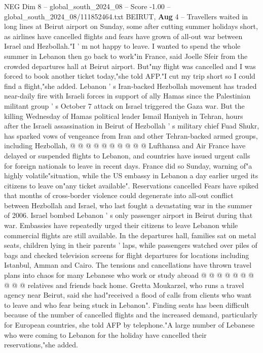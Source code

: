 \begin{textsample}{NEG Dim 8 – global\_south\_2024\_08 – Score -1.00 – global\_south\_2024\_08/111852464.txt}  \label{ex:f8_neg_075}
BEIRUT, \textbf{Aug} 4 -- Travellers waited in long lines at Beirut airport on Sunday, some after cutting summer holidays short, as airlines have cancelled flights and fears have grown of all-out war between Israel and Hezbollah."I ' m not happy to leave.
I wanted to spend the whole summer in Lebanon then go back to work"in France, said Joelle Sfeir from the crowded departures hall at Beirut airport.
But"my flight was cancelled and I was forced to book another ticket today,"she told AFP."I cut my trip short so I could find a flight,"she added.
Lebanon ' s Iran-backed Hezbollah movement has traded near-daily fire with Israeli forces in support of ally Hamas since the Palestinian militant group ' s October 7 attack on Israel triggered the Gaza war.
But the killing Wednesday of Hamas political leader Ismail Haniyeh in Tehran, hours after the Israeli assassination in Beirut of Hezbollah ' s military chief Fuad Shukr, has sparked vows of vengeance from Iran and other Tehran-backed armed groups, including Hezbollah, @ @ @ @ @ @ @ @ @ @ Lufthansa and Air France have delayed or suspended flights to Lebanon, and countries have issued urgent calls for foreign nationals to leave in recent days.
France did so Sunday, warning of"a highly volatile"situation, while the US embassy in Lebanon a day earlier urged its citizens to leave on"any ticket available".
Reservations cancelled Fears have spiked that months of cross-border violence could degenerate into all-out conflict between Hezbollah and Israel, who last fought a devastating war in the summer of 2006.
Israel bombed Lebanon ' s only passenger airport in Beirut during that war.
Embassies have repeatedly urged their citizens to leave Lebanon while commercial flights are still available.
In the departures hall, families sat on metal seats, children lying in their parents ' laps, while passengers watched over piles of bags and checked television screens for flight departures for locations including Istanbul, Amman and Cairo.
The tensions and cancellations have thrown travel plans into chaos for many Lebanese who work or study abroad @ @ @ @ @ @ @ @ @ @ relatives and friends back home.
Gretta Moukarzel, who runs a travel agency near Beirut, said she had"received a flood of calls from clients who want to leave and who fear being stuck in Lebanon".
Finding seats has been difficult because of the number of cancelled flights and the increased demand, particularly for European countries, she told AFP by telephone."A large number of Lebanese who were coming to Lebanon for the holiday have cancelled their reservations,"she added.

\end{textsample}
